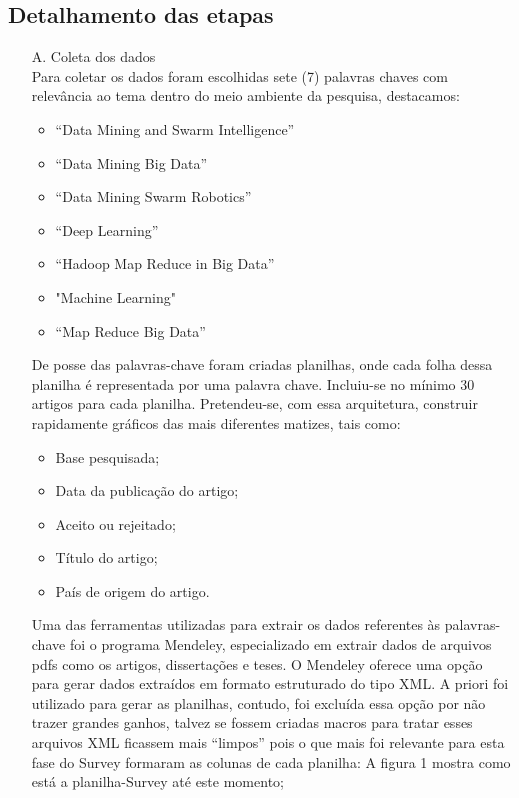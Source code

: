 \documentclass[conference,compsoc]{IEEEtran}
\begin{document}
\subsection{Detalhamento das etapas}

\begin{enumerate}
 \item[A.] Coleta dos dados\\
 Para coletar os dados foram escolhidas sete (7) palavras chaves com relevância ao tema dentro do meio ambiente da pesquisa, destacamos:
  \begin{itemize}
    \item “Data Mining and Swarm Intelligence”
    \item “Data Mining Big Data”
    \item “Data Mining Swarm Robotics”
    \item “Deep Learning”
	\item “Hadoop Map Reduce in Big Data”    
    \item "Machine Learning"
    \item “Map Reduce Big Data”
  \end{itemize}


 De posse das palavras-chave foram criadas planilhas, onde cada folha dessa planilha é representada por uma palavra chave. 
 Incluiu-se no mínimo 30 artigos para cada planilha. 
 Pretendeu-se, com essa arquitetura, construir rapidamente gráficos das mais diferentes matizes, tais como:
  \begin{itemize}
    \item Base pesquisada;
    \item Data da publicação do artigo;
    \item Aceito ou rejeitado;
    \item Título do artigo;
    \item País de origem do artigo.
  \end{itemize}

  Uma das ferramentas utilizadas para extrair os dados referentes às palavras-chave foi o programa Mendeley, especializado
  em extrair dados de arquivos pdfs como os artigos, dissertações e teses. O Mendeley oferece uma opção para gerar dados 
  extraídos em formato estruturado do tipo XML. A priori foi utilizado para gerar as planilhas, contudo, foi excluída essa
  opção por não trazer grandes ganhos, talvez se fossem criadas macros para tratar esses arquivos XML ficassem mais ``limpos''
  pois o que mais foi relevante para esta fase do Survey formaram as colunas de cada planilha:
  A figura 1 mostra como está a planilha-Survey até este momento;
  

\end{enumerate}
\end{document}
